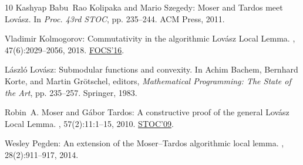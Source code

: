 \documentclass[11pt]{article}
\begin{document}
\begin{thebibliography}{10}
{\sc Kashyap Babu~Rao Kolipaka and Mario Szegedy}: {M}oser and {T}ardos meet
  {L}ov{\'a}sz.
\newblock In {\em Proc. 43rd STOC}, pp. 235--244. ACM Press, 2011.
\newblock [\epfmtdoi{10.1145/1993636.1993669}]

{\sc Vladimir Kolmogorov}: Commutativity in the algorithmic {L}ov{\'a}sz
  {L}ocal {L}emma.
, 47(6):2029--2056, 2018.
\newblock \prelim \href{https://doi.org/10.1109/FOCS.2016.88}{FOCS'16}.
\newblock [\epfmtdoi{10.1137/16M1093306}]

{\sc L{\'a}szl{\'o} Lov{\'a}sz}: Submodular functions and convexity.
\newblock In {\sc Achim Bachem, Bernhard Korte, and Martin Gr\"otschel},
  editors, {\em Mathematical Programming: {T}he State of the Art}, pp.
  235--257. Springer, 1983.
\newblock [\epfmtdoi{10.1007/978-3-642-68874-4\_10}]

{\sc Robin~A. Moser and G{\'a}bor Tardos}: A constructive proof of the general
  {L}ov\'asz {L}ocal {L}emma.
, 57(2):11:1--15, 2010.
\newblock \prelim \href{https://doi.org/10.1145/1536414.1536462}{STOC'09}.
\newblock [\epfmtdoi{10.1145/1667053.1667060}]

{\sc Wesley Pegden}: An extension of the {M}oser--{T}ardos algorithmic local
  lemma.
, 28(2):911--917, 2014.
\newblock [\epfmtdoi{10.1137/110828290}]

\end{thebibliography}
\end{document}
